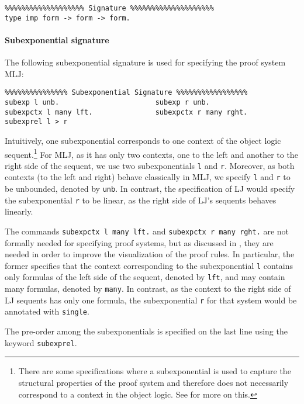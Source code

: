 \documentclass{llncs}
\begin{document}
{\small
\begin{verbatim}
%%%%%%%%%%%%%%%%%%% Signature %%%%%%%%%%%%%%%%%%%%
type imp form -> form -> form.
\end{verbatim}
}

\paragraph{Subexponential signature}
%
The following subexponential signature is used for specifying the proof system MLJ:
\vspace{-1mm}

{\small
\begin{verbatim}
%%%%%%%%%%%%%%% Subexponential Signature %%%%%%%%%%%%%%%%%
subexp l unb.                       subexp r unb.            
subexpctx l many lft.               subexpctx r many rght.
subexprel l > r
\end{verbatim}
}

Intuitively, one subexponential corresponds to one context of the object logic sequent.\footnote{There are 
some specifications where a subexponential is used to capture the structural properties of the proof 
system and therefore does not necessarily correspond to a context in the object logic. See \cite{nigam.jlc}
for more on this.}
For MLJ, as it has only two
contexts, one to the left and another to the right side of the sequent, we use two subexponentials
\texttt{l} and \texttt{r}. Moreover, as both contexts (to the left and right) behave classically in MLJ, 
we specify \texttt{l} and \texttt{r} to be unbounded, denoted by \texttt{unb}. In contrast, 
the specification of LJ would specify the subexponential \texttt{r} to be linear, as the right side of LJ's 
sequents behaves linearly.

The commands \texttt{subexpctx l many lft.} and  \texttt{subexpctx r many rght.} are not formally needed for specifying proof systems, 
but as discussed 
in \cite{nigam14ebl}, they are needed in order to improve the visualization of the proof rules. 
In particular, the former specifies that the context corresponding to the subexponential \texttt{l} contains 
only formulas of the left side of the sequent, denoted by \texttt{lft}, and may contain many formulas, denoted 
by \texttt{many}. In contrast, as the context to the right side of LJ sequents has only one formula, the 
subexponential \texttt{r} for that system would be annotated with \texttt{single}.

The pre-order among the subexponentials is specified on the last line using the
keyword \texttt{subexprel}.
\end{document}
